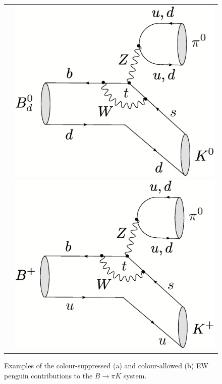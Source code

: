 \documentclass[12pt]{article}
\begin{document}
\begin{figure}
{\begin{tabular}{lc}
    &     \includegraphics[width=5.2truecm]{B0dtopi0K0-EW-pen.ps} 
     \hspace*{0.5truecm}
    \includegraphics[width=5.2truecm]{Bptopi0KP-EW-pen.ps} 
     \end{tabular}}
     \caption{Examples of the colour-suppressed (a) and colour-allowed (b) 
     EW penguin contributions to the $B\to\pi K$ system.}\label{fig:BpiK-EWP}
\end{figure}
\end{document}
